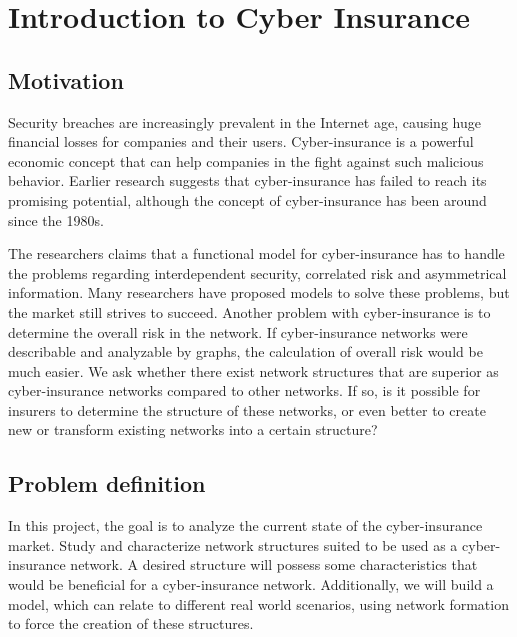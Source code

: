 \chapter{Introduction to Cyber Insurance}
\label{chp:introductionToCyberInsurance} 

\section{Motivation}
Security breaches are increasingly prevalent in the Internet age, causing huge financial losses for companies and their users. Cyber-insurance is a powerful economic concept that can help companies in the fight against such malicious behavior. Earlier research suggests that cyber-insurance has failed to reach its promising potential, although the concept of cyber-insurance has been around since the 1980s. 

The researchers claims that a functional model for cyber-insurance has to handle the problems regarding interdependent security, correlated risk and asymmetrical information. Many researchers have proposed models to solve these problems, but the market still strives to succeed. Another problem with cyber-insurance is to determine the overall risk in the network. If cyber-insurance networks were describable and analyzable by graphs, the calculation of overall risk would be much easier. We ask whether there exist network structures that are superior as cyber-insurance networks compared to other networks. If so, is it possible for insurers to determine the structure of these networks, or even better to create new or transform existing networks into a certain structure?

\section{Problem definition}
In this project, the goal is to analyze the current state of the cyber-insurance market. Study and characterize network structures suited to be used as a cyber-insurance network. A desired structure will possess some characteristics that would be beneficial for a cyber-insurance network. Additionally, we will build a model, which can relate to different real world scenarios, using network formation to force the creation of these structures. 

